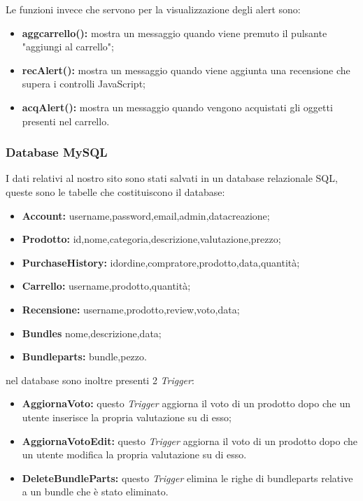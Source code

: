 Le funzioni invece che servono per la visualizzazione degli alert sono:
\begin{itemize}
	\item \textbf{aggcarrello():} mostra un messaggio quando viene premuto il pulsante "aggiungi al carrello";
	\item \textbf{recAlert():} mostra un messaggio quando viene aggiunta una recensione che supera i controlli JavaScript; 
	\item \textbf{acqAlert():} mostra un messaggio quando vengono acquistati gli oggetti presenti nel carrello.
\end{itemize}



\subsubsection{Database MySQL}
I dati relativi al nostro sito sono stati salvati in un database relazionale SQL, queste sono le tabelle che costituiscono il database:
\begin{itemize}
    \item \textbf{Account:} username,password,email,admin,datacreazione;
    \item \textbf{Prodotto:} id,nome,categoria,descrizione,valutazione,prezzo;
    \item \textbf{PurchaseHistory:} idordine,compratore,prodotto,data,quantità;
    \item \textbf{Carrello:} username,prodotto,quantità;
    \item \textbf{Recensione:} username,prodotto,review,voto,data;
    \item \textbf{Bundles} nome,descrizione,data;
    \item \textbf{Bundleparts:} bundle,pezzo.	
\end{itemize}
nel database sono inoltre presenti 2 \emph{Trigger}:
\begin{itemize}
	\item \textbf{AggiornaVoto:} questo \emph{Trigger} aggiorna il voto di un prodotto dopo che un utente inserisce la propria valutazione su di esso;
	\item \textbf{AggiornaVotoEdit:} questo \emph{Trigger} aggiorna il voto di un prodotto dopo che un utente modifica la propria valutazione su di esso.
	\item \textbf{DeleteBundleParts:} questo \emph{Trigger} elimina le righe di bundleparts relative a un bundle che è stato eliminato.
\end{itemize}
